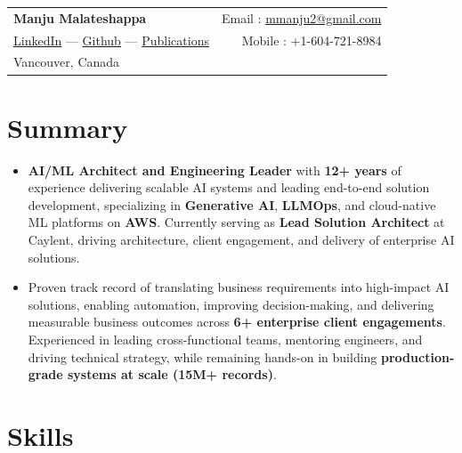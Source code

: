 \documentclass[10pt,a4paper]{article}
\begin{document}
\pagestyle{empty}

\noindent
\begin{tabularx}{\textwidth}{@{}X r@{}}
  {\LARGE\textbf{Manju Malateshappa}} & Email : \href{mailto:mmanju2@gmail.com}{mmanju2@gmail.com} \\
  \href{https://www.linkedin.com/in/manju-malateshappa/}{LinkedIn} ---
  \href{https://github.com/manju-malateshappa}{Github} ---
  \href{https://ieeexplore.ieee.org/abstract/document/6718977?reload=true}{Publications}
  & Mobile : +1-604-721-8984 \\
  Vancouver, Canada & \\
\end{tabularx}

\section{Summary}

\begin{itemize}[leftmargin=*, label=\textbullet]
  \item \textbf{AI/ML Architect and Engineering Leader} with \textbf{12+ years} of experience delivering scalable AI systems and leading end-to-end solution development, specializing in \textbf{Generative AI}, \textbf{LLMOps}, and cloud-native ML platforms on \textbf{AWS}. Currently serving as \textbf{Lead Solution Architect} at Caylent, driving architecture, client engagement, and delivery of enterprise AI solutions.
  \item Proven track record of translating business requirements into high-impact AI solutions, enabling automation, improving decision-making, and delivering measurable business outcomes across \textbf{6+ enterprise client engagements}. Experienced in leading cross-functional teams, mentoring engineers, and driving technical strategy, while remaining hands-on in building \textbf{production-grade systems at scale (15M+ records)}.
\end{itemize}

\section{Skills}
\end{document}
